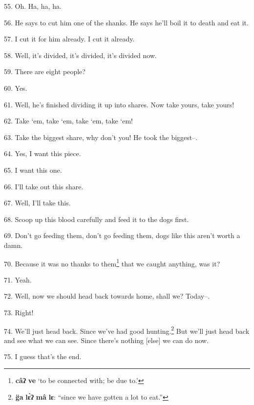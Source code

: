 55. Oh. Ha, ha, ha.

56. He says to cut him one of the shanks. He says he'll boil it to death and eat
it.

57. I cut it for him already. I cut it already.

58. Well, it's divided, it's divided, it's divided now.

59. There are eight people?

60. Yes.

61. Well, he's finished dividing it up into shares. Now take yours, take yours!

62. Take `em, take `em, take `em, take `em!

63. Take the biggest share, why don't you! He took the biggest--.

64. Yes, I want this piece.

65. I want this one.

66. I'll take out this share.

67. Well, I'll take this.

68. Scoop up this blood carefully and feed it to the dogs first.

69. Don't go feeding them, don't go feeding them, dogs like this aren't worth a
damn.

70. Because it was no thanks to them\footnote{\textbf{câʔ} \textbf{ve} `to be connected with; be due to.'} that we caught anything, was it?

71. Yeah.

72. Well, now we should head back towards home, shall we? Today--.

73. Right!

74. We'll just head back. Since we've had good hunting.\footnote{\textbf{g̈a} \textbf{lɛ̀ʔ} \textbf{mâ} \textbf{lɛ}: ``since we have gotten a lot to eat.''} But we'll just head
back and see what we can see. Since there's nothing [else] we can do now.

75. I guess that's the end.

